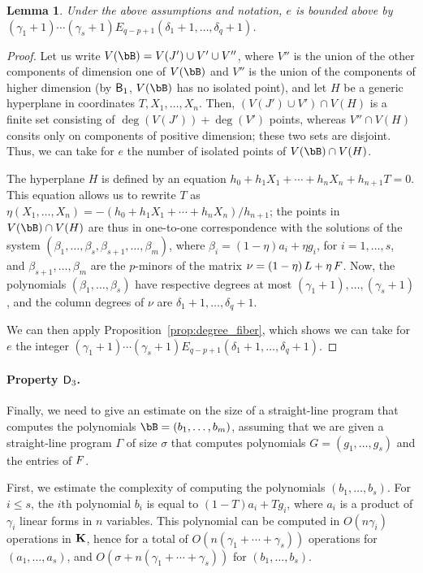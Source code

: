 \documentclass[12pt]{article}
\newtheorem{lemma}[definition]{Lemma}
\begin{document}
\begin{lemma}\label{lemma:columndegree:e_estimate}
  Under the above assumptions and notation, $e$ is bounded above by
  $(\gamma_1+1)\cdots(\gamma_s+1) E_{q-p+1}(\delta_1+1, \ldots, \delta_q+1)$.
\end{lemma}
\begin{proof}
Let us write $V(\bB)=V(J') \cup V' \cup V''$, where $V''$ is the union
of the other components of dimension one of $V(\bB)$ and $V''$ is the
union of the components of higher dimension (by $\mathsf{B}_1$, $V(\bB)$
has no isolated point), and let $H$ be a generic hyperplane in
coordinates $T,X_1,\dots,X_n$. Then, $(V(J') \cup V') \cap V(H)$ is a
finite set consisting of $\deg(V(J')) + \deg(V')$ points, whereas $V''
\cap V(H)$ consits only on components of positive dimension; these two
sets are disjoint. Thus, we can take for $e$ the number of isolated 
points of $V(\bB)\cap V(H)$.

The hyperplane $H$ is defined by an equation
$h_0 + h_1 X_1 + \cdots + h_{n}X_{n} + h_{n+1} T=0$. This equation
allows us to rewrite $T$ as
$\eta(X_1,\dots,X_n)=-(h_0 + h_1 X_1 + \cdots +
h_{n}X_{n})/h_{n+1}$;
the points in $V(\bB)\cap V(H)$ are thus in one-to-one correspondence
with the solutions of the system
$(\beta_1,\dots,\beta_s,\beta_{s+1},\dots,\beta_m)$, where
$\beta_i=(1-\eta) a_i + \eta g_i$, for $i=1,\dots,s$, and
$\beta_{s+1},\dots,\beta_m$ are the $p$-minors of the matrix
${\nu}=(1-\eta)\, {L} + \eta \, {F} $.  Now, the polynomials
$(\beta_1,\dots,\beta_s)$ have respective degrees at most
$(\gamma_1+1),\dots,(\gamma_s+1)$, and the column degrees of ${\nu}$
are $\delta_1+1,\dots,\delta_q+1$.

We can then apply Proposition~\ref{prop:degree_fiber}, which shows we
can take for $e$ the integer $(\gamma_1+1)\cdots(\gamma_s+1)
E_{q-p+1}(\delta_1+1, \ldots, \delta_q+1)$.  
\end{proof}

\paragraph{Property $\mathsf{D}_3$.} Finally, we need to give an estimate on
the size of a straight-line program that computes the polynomials
$\bB=(b_1,\dots,b_m)$, assuming that we are given a straight-line
program $\Gamma$ of size $\sigma$ that computes polynomials $G=(g_1,\dots,g_s)$ and
the entries of ${F}$.

First, we estimate the complexity of computing the polynomials
$(b_1,\dots,b_s)$. For $i \le s$, the $i$th polynomial $b_i$ is equal
to $(1-T)a_i + T g_i$, where $a_i$ is a product of $\gamma_i$ linear
forms in $n$ variables. This polynomial can be computed in $O(n
\gamma_i)$ operations in $\mathbf{K}$, hence for a total of $O(n
(\gamma_1+\cdots+\gamma_s))$ operations for $(a_1,\dots,a_s)$, and $O(\sigma+n (\gamma_1+\cdots+\gamma_s))$ for $(b_1,\dots,b_s)$. 
\end{document}

